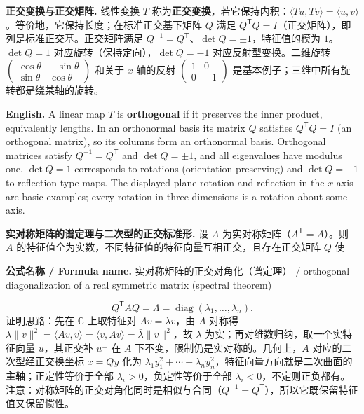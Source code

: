 \documentclass[UTF8,11pt,a4paper]{ctexart}
\newcommand{\EN}[1]{\par\noindent\textbf{English.} #1\par}
\newcommand{\FORMULA}[2]{\par\noindent\textbf{公式名称 / Formula name.} #1 / #2\par}
\begin{document}
\noindent\textbf{正交变换与正交矩阵.} 线性变换 $T$ 称为\textbf{正交变换}，若它保持内积：$\langle Tu,Tv\rangle=\langle u,v\rangle$。等价地，它保持长度；在标准正交基下矩阵 $Q$ 满足 $Q^{\mathsf T}Q=I$（正交矩阵），即列是标准正交基。正交矩阵满足 $Q^{-1}=Q^{\mathsf T}$、$\det Q=\pm1$，特征值的模为 $1$。$\det Q=1$ 对应旋转（保持定向），$\det Q=-1$ 对应反射型变换。二维旋转 $\begin{pmatrix}\cos\theta&-\sin\theta\\\sin\theta&\cos\theta\end{pmatrix}$ 和关于 $x$ 轴的反射 $\begin{pmatrix}1&0\\0&-1\end{pmatrix}$ 是基本例子；三维中所有旋转都是绕某轴的旋转。
\EN{A linear map $T$ is \textbf{orthogonal} if it preserves the inner product, equivalently lengths. In an orthonormal basis its matrix $Q$ satisfies $Q^{\mathsf T}Q=I$ (an orthogonal matrix), so its columns form an orthonormal basis. Orthogonal matrices satisfy $Q^{-1}=Q^{\mathsf T}$ and $\det Q=\pm1$, and all eigenvalues have modulus one. $\det Q=1$ corresponds to rotations (orientation preserving) and $\det Q=-1$ to reflection-type maps. The displayed plane rotation and reflection in the $x$-axis are basic examples; every rotation in three dimensions is a rotation about some axis.}
\noindent\textbf{实对称矩阵的谱定理与二次型的正交标准形.} 设 $A$ 为实对称矩阵（$A^{\mathsf T}=A$）。则 $A$ 的特征值全为实数，不同特征值的特征向量互相正交，且存在正交矩阵 $Q$ 使
\FORMULA{实对称矩阵的正交对角化（谱定理）}{orthogonal diagonalization of a real symmetric matrix (spectral theorem)}
\[
Q^{\mathsf T}AQ=\Lambda=\operatorname{diag}(\lambda_1,\dots,\lambda_n).
\]
证明思路：先在 $\mathbb C$ 上取特征对 $Av=\lambda v$，由 $A$ 对称得 $\lambda\|v\|^2=\langle Av,v\rangle=\langle v,Av\rangle=\bar\lambda\|v\|^2$，故 $\lambda$ 为实；再对维数归纳，取一个实特征向量 $u$，其正交补 $u^\perp$ 在 $A$ 下不变，限制仍是实对称的。几何上，$A$ 对应的二次型经正交换坐标 $x=Qy$ 化为 $\lambda_1y_1^2+\cdots+\lambda_ny_n^2$，特征向量方向就是二次曲面的\textbf{主轴}；正定性等价于全部 $\lambda_i>0$，负定性等价于全部 $\lambda_i<0$，不定则正负都有。注意：对称矩阵的正交对角化同时是相似与合同（$Q^{-1}=Q^{\mathsf T}$），所以它既保留特征值又保留惯性。
\end{document}
